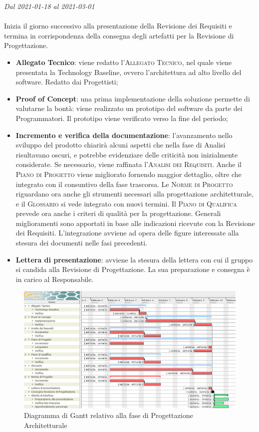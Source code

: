 \textit{Dal 2021-01-18 al 2021-03-01}
\\\\
Inizia il giorno successivo alla presentazione della Revisione dei Requisiti e termina in corrispondenza della consegna degli artefatti per la Revisione di Progettazione.
\begin{itemize}
	\item \textbf{Allegato Tecnico}: viene redatto l'\textsc{Allegato Tecnico}, nel quale viene presentata la Technology Baseline, ovvero l'architettura ad alto livello del software. Redatto dai Progettisti;
	\item \textbf{Proof of Concept}: una prima implementazione della soluzione permette di valutarne la bontà: viene realizzato un prototipo del software da parte dei Programmatori. Il prototipo viene verificato verso la fine del periodo;
	\item \textbf{Incremento e verifica della documentazione}: l'avanzamento nello sviluppo del prodotto chiarirà alcuni aspetti che nella fase di Analisi risultavano oscuri, e potrebbe evidenziare delle criticità non inizialmente considerate. Se necessario, viene raffinata l'\textsc{Analisi dei Requisiti}. Anche il \textsc{Piano di Progetto} viene migliorato fornendo maggior dettaglio, oltre che integrato con il consuntivo della fase trascorsa. Le \textsc{Norme di Progetto} riguardano ora anche gli strumenti necessari alla progettazione architetturale, e il \textsc{Glossario} si vede integrato con nuovi termini. Il \textsc{Piano di Qualifica} prevede ora anche i criteri di qualità per la progettazione. Generali miglioramenti sono apportati in base alle indicazioni ricevute con la Revisione dei Requisiti. L'integrazione avviene ad opera delle figure interessate alla stesura dei documenti nelle fasi precedenti.
	\item \textbf{Lettera di presentazione}: avviene la stesura della lettera con cui il gruppo si candida alla Revisione di Progettazione. La sua preparazione e consegna è in carico al Responsabile.
\end{itemize}

\begin{figure}[H]
	\centering
	\includegraphics[scale=0.50]{res/images/03_gantt_progettazione.png}
	\caption{Diagramma di Gantt relativo alla fase di Progettazione Architetturale}
\end{figure}

